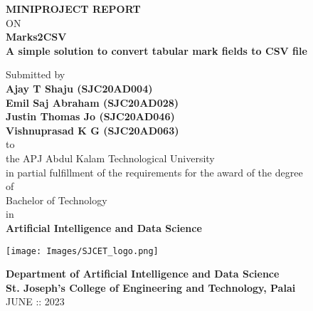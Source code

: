 

\setcounter{page}{1}


\newpage %

\thispagestyle{empty}
\begin{center}
 
{\normalsize \bf MINIPROJECT REPORT}\\
ON\\
\vspace*{0.2 cm}
{\huge \bf Marks2CSV}\\
{\normalsize \bf A simple solution to convert tabular mark fields to CSV file}

   \vspace{0.5 cm}
   \large Submitted by\\
   { \bf Ajay T Shaju (SJC20AD004)}\\
   { \bf Emil Saj Abraham (SJC20AD028)}\\
   { \bf Justin Thomas Jo (SJC20AD046)}\\
   { \bf Vishnuprasad K G (SJC20AD063)}\\[-0.6mm]
  {\large to\\[-0.6mm] the APJ Abdul Kalam Technological University\\[-0.6mm] in partial fulfillment of the requirements for the award of the degree\\[-0.6mm] of\\[-0.6mm] Bachelor of Technology\\[-0.6mm] in\\[-0.6mm] {\bf Artificial Intelligence and Data Science}}
  
   \begin{center}
   \texttt{[image: Images/SJCET\_logo.png]}
   \end{center}
   \vspace*{-0.5cm}
  {\LARGE {\bf Department of Artificial Intelligence and Data Science}}\\
          [-3mm] {\large {\bf St. Joseph's College of Engineering and Technology, Palai}\\
           [1mm] JUNE :: 2023}

\end{center}

